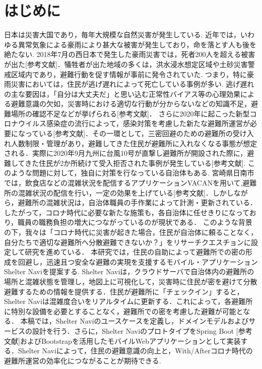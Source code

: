 \documentclass[technicalreport,dvipdfmx]{ieicej}
\begin{document}
\begin{jabstract}
\end{jabstract}
\begin{jkeyword}
\end{jkeyword}
\begin{eabstract}
\end{eabstract}
\begin{ekeyword}
\end{ekeyword}
\maketitle

\section{はじめに}
日本は災害大国であり，毎年大規模な自然災害が発生している. 近年では，いわゆる異常気象による豪雨により甚大な被害が発生しており，命を落とす人も後を絶たない. 2018年7月の西日本で発生した豪雨災害では，死者200人を超える被害が出た[参考文献]．犠牲者が出た地域の多くは，洪水浸水想定区域や土砂災害警戒区域内であり，避難行動を促す情報が事前に発令されていた. つまり，特に豪雨災害においては，住民が逃げ遅れによって死亡している事例が多い. 逃げ遅れの主な要因は，「自分は大丈夫だ」と思い込む正常性バイアス等の心理効果による避難意識の欠如，災害時における適切な行動が分からないなどの知識不足，避難場所の確認不足などが挙げられる[参考文献]．
さらに2020年に起こった新型コロナウイルス感染症の流行によって，感染対策を考慮した新たな避難所運営が必要になっている[参考文献]．その一環として，三密回避のための避難所の受け入れ人数制限・管理があり，避難してきた住民が避難所に入れなくなる事態が想定される．実際に2020年9月九州に台風10号が直撃し避難所が開設された際に，避難してきた住民が2か所続けて受入拒否された事例が発生している[参考文献]. 
このような問題に対して，独自に対策を行なっている自治体もある. 宮崎県日南市では，飲食店などの混雑状況を配信するアプリケーションVACANを用いて,避難所の混雑状況の配信を行い，一定の効果を上げている[参考文献]．しかしながら，避難所の混雑状況は，自治体職員の手作業によって計測・更新されている．したがって，コロナ時代に必要な新たな施策も，各自治体に任せきりになっており，職員の職務負担の増大につながっているのが現状である．
このような背景の下，我々は「コロナ時代に災害が起きた場合，住民が自治体に頼ることなく，自分たちで適切な避難所へ分散避難できないか？」をリサーチクエスチョンに設定して研究を進めている．
本研究では，住民の自助によって避難所での密の形成を回避し，迅速且つ安全な避難の実現を支援するモバイル・アプリケーションShelter Naviを提案する. Shelter Naviは，クラウドサーバで自治体内の避難所の場所と混雑状態を管理し，地図上に可視化して，災害時に住民が密を避けて分散避難するための情報を提供する．住民が避難所に「チェックイン」すると，Shelter Naviは混雑度合いをリアルタイムに更新する．これによって，各避難所に特別な設備を必要とすることなく，避難所での密を考慮した避難が可能となる．
本稿では，Shelter Naviのユースケースを定義し，ドメインモデルおよびサービスの設計を行う．さらに，Shelter NaviのプロトタイプをSpring Boot [参考文献]およびBootstrapを活用したモバイルWebアプリケーションとして実装する．Shelter Naviによって，住民の避難意識の向上と，With/Afterコロナ時代の避難所運営の効率化につながることが期待できる.
\end{document}
